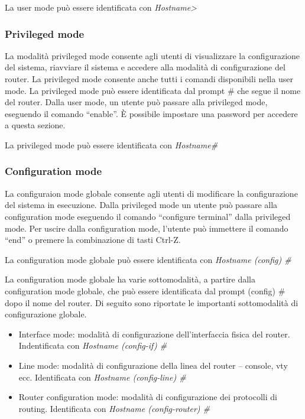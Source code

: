 La user mode può essere identificata con \emph{Hostname>}

\subsubsection{Privileged mode}
La modalità privileged mode consente agli utenti di visualizzare la configurazione del sistema, riavviare il sistema e accedere alla modalità di configurazione del router. La privileged mode consente anche tutti i comandi disponibili nella user mode. La privileged mode può essere identificata dal prompt \# che segue il nome del router. Dalla user mode, un utente può passare alla privileged mode, eseguendo il comando “enable”. È possibile impostare una password per accedere a questa sezione.

La privileged mode può essere identificata con \emph{Hostname\#}

\subsubsection{Configuration mode}
La configuraion mode globale consente agli utenti di modificare la configurazione del sistema in esecuzione. Dalla privileged mode un utente può passare alla configuration mode eseguendo il comando “configure terminal” dalla privileged mode. Per uscire dalla configuration mode, l’utente può immettere il comando “end” o premere la combinazione di tasti Ctrl-Z.

La configuration mode  globale può essere identificata con \emph{Hostname (config) \#}

La configuration mode globale ha varie sottomodalità, a partire dalla configuration mode globale, che può essere identificata dal prompt (config) \# dopo il nome del router. Di seguito sono riportate le importanti sottomodalità di configurazione globale.

\begin{itemize}
    \item Interface mode: modalità di configurazione dell’interfaccia fisica del router. Indentificata con \emph{Hostname (config-if) \#}
    \item Line mode: modalità di configurazione della linea del router – console, vty ecc. Identificata con \emph{Hostname (config-line) \#}
    \item Router configuration mode: modalità di configurazione dei protocolli di routing. Identificata con \emph{Hostname (config-router) \#}
\end{itemize}

